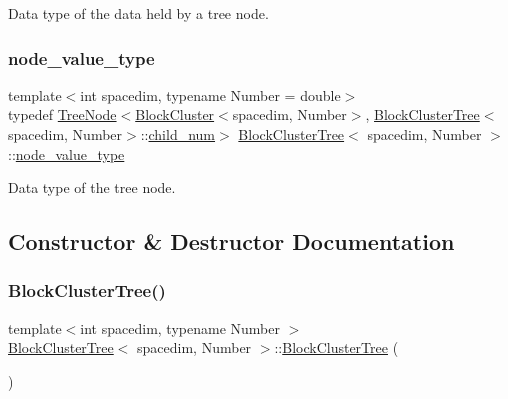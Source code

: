 Data type of the data held by a tree node. \mbox{\label{classBlockClusterTree_a960c20eac27464dedd804261f185c61f}} 
\subsubsection{\texorpdfstring{node\+\_\+value\+\_\+type}{node\_value\_type}}
{\footnotesize\ttfamily template$<$int spacedim, typename Number = double$>$ \\
typedef \hyperlink{classTreeNode}{Tree\+Node}$<$\hyperlink{classBlockCluster}{Block\+Cluster}$<$spacedim, Number$>$, \hyperlink{classBlockClusterTree}{Block\+Cluster\+Tree}$<$spacedim, Number$>$\+::\hyperlink{classBlockClusterTree_a000c439b578bcf4fa28b7f3edd6079e9}{child\+\_\+num}$>$ \hyperlink{classBlockClusterTree}{Block\+Cluster\+Tree}$<$ spacedim, Number $>$\+::\hyperlink{classBlockClusterTree_a960c20eac27464dedd804261f185c61f}{node\+\_\+value\+\_\+type}}

Data type of the tree node. 

\subsection{Constructor \& Destructor Documentation}
\mbox{\label{classBlockClusterTree_a20b1ec6a9e81c252b1994c5a99c44af4}} 
\subsubsection{\texorpdfstring{Block\+Cluster\+Tree()}{BlockClusterTree()}\hspace{0.1cm}{\footnotesize\ttfamily [1/8]}}
{\footnotesize\ttfamily template$<$int spacedim, typename Number $>$ \\
\hyperlink{classBlockClusterTree}{Block\+Cluster\+Tree}$<$ spacedim, Number $>$\+::\hyperlink{classBlockClusterTree}{Block\+Cluster\+Tree} (\begin{DoxyParamCaption}{ }\end{DoxyParamCaption})}

